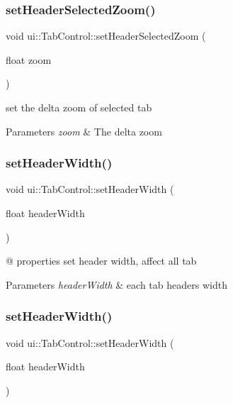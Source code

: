 \subsubsection{\texorpdfstring{set\+Header\+Selected\+Zoom()}{setHeaderSelectedZoom()}\hspace{0.1cm}{\footnotesize\ttfamily [2/2]}}
{\footnotesize\ttfamily void ui\+::\+Tab\+Control\+::set\+Header\+Selected\+Zoom (\begin{DoxyParamCaption}\item[{float}]{zoom }\end{DoxyParamCaption})}

set the delta zoom of selected tab 
\begin{DoxyParams}{Parameters}
{\em zoom} & The delta zoom \\
\hline
\end{DoxyParams}
\mbox{\label{classui_1_1TabControl_a684dfc06887f10ff5dddb1085aab7dd4}} 
\subsubsection{\texorpdfstring{set\+Header\+Width()}{setHeaderWidth()}\hspace{0.1cm}{\footnotesize\ttfamily [1/2]}}
{\footnotesize\ttfamily void ui\+::\+Tab\+Control\+::set\+Header\+Width (\begin{DoxyParamCaption}\item[{float}]{header\+Width }\end{DoxyParamCaption})}

@ properties set header width, affect all tab 
\begin{DoxyParams}{Parameters}
{\em header\+Width} & each tab header\textquotesingle{}s width \\
\hline
\end{DoxyParams}
\mbox{\label{classui_1_1TabControl_a684dfc06887f10ff5dddb1085aab7dd4}} 
\subsubsection{\texorpdfstring{set\+Header\+Width()}{setHeaderWidth()}\hspace{0.1cm}{\footnotesize\ttfamily [2/2]}}
{\footnotesize\ttfamily void ui\+::\+Tab\+Control\+::set\+Header\+Width (\begin{DoxyParamCaption}\item[{float}]{header\+Width }\end{DoxyParamCaption})}

